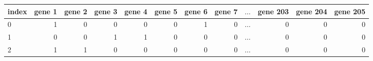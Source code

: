 \begin{tabular}{lrrrrrrrrrrr}
\toprule
index &  gene 1 &  gene 2 &  gene 3 &  gene 4 &  gene 5 &  gene 6 &  gene 7 &  \(\dots\) &   gene 203 &  gene 204 &  gene 205 \\
\midrule
0     &       1 &       0 &       0 &       0 &       0 &       1 &       0 &  \(\dots\) &         0 &         0 &         0 \\
1     &       0 &       0 &       1 &       1 &       0 &       0 &       0 &  \(\dots\) &         0 &         0 &         0 \\
2     &       1 &       1 &       0 &       0 &       0 &       0 &       0 &  \(\dots\) &         0 &         0 &         0 \\
\bottomrule
\end{tabular}
